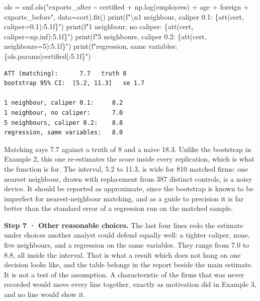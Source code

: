 \documentclass[
  letterpaper,
  10pt,
  twoside,
  openright,
  numbers=noenddot,
  chapterprefix=true]{scrbook}
\newenvironment{Shaded}{}{}
\newcommand{\BuiltInTok}[1]{\textcolor[rgb]{0.84,0.23,0.29}{#1}}
\newcommand{\CharTok}[1]{\textcolor[rgb]{0.01,0.18,0.38}{#1}}
\newcommand{\DecValTok}[1]{\textcolor[rgb]{0.00,0.36,0.77}{#1}}
\newcommand{\FloatTok}[1]{\textcolor[rgb]{0.00,0.36,0.77}{#1}}
\newcommand{\NormalTok}[1]{\textcolor[rgb]{0.14,0.16,0.18}{#1}}
\newcommand{\OperatorTok}[1]{\textcolor[rgb]{0.14,0.16,0.18}{#1}}
\newcommand{\SpecialCharTok}[1]{\textcolor[rgb]{0.00,0.36,0.77}{#1}}
\newcommand{\SpecialStringTok}[1]{\textcolor[rgb]{0.01,0.18,0.38}{#1}}
\newcommand{\StringTok}[1]{\textcolor[rgb]{0.01,0.18,0.38}{#1}}
\begin{document}
\begin{Shaded}
\begin{Highlighting}[]
\NormalTok{ols }\OperatorTok{=}\NormalTok{ smf.ols(}\StringTok{"exports\_after \textasciitilde{} certified + np.log(employees) + age + foreign + exports\_before"}\NormalTok{,}
\NormalTok{              data}\OperatorTok{=}\NormalTok{cert).fit()}
\BuiltInTok{print}\NormalTok{(}\SpecialStringTok{f"}\CharTok{\textbackslash{}n}\SpecialStringTok{1 neighbour, caliper 0.1:   }\SpecialCharTok{\{}\NormalTok{att(cert, caliper}\OperatorTok{=}\FloatTok{0.1}\NormalTok{)}\SpecialCharTok{:5.1f\}}\SpecialStringTok{"}\NormalTok{)}
\BuiltInTok{print}\NormalTok{(}\SpecialStringTok{f"1 neighbour, no caliper:    }\SpecialCharTok{\{}\NormalTok{att(cert, caliper}\OperatorTok{=}\NormalTok{np.inf)}\SpecialCharTok{:5.1f\}}\SpecialStringTok{"}\NormalTok{)}
\BuiltInTok{print}\NormalTok{(}\SpecialStringTok{f"5 neighbours, caliper 0.2:  }\SpecialCharTok{\{}\NormalTok{att(cert, neighbours}\OperatorTok{=}\DecValTok{5}\NormalTok{)}\SpecialCharTok{:5.1f\}}\SpecialStringTok{"}\NormalTok{)}
\BuiltInTok{print}\NormalTok{(}\SpecialStringTok{f"regression, same variables: }\SpecialCharTok{\{}\NormalTok{ols}\SpecialCharTok{.}\NormalTok{params[}\StringTok{\textquotesingle{}certified\textquotesingle{}}\NormalTok{]}\SpecialCharTok{:5.1f\}}\SpecialStringTok{"}\NormalTok{)}
\end{Highlighting}
\end{Shaded}

\begin{verbatim}
ATT (matching):      7.7   truth 8
bootstrap 95% CI:  [5.2, 11.3]   se 1.7

1 neighbour, caliper 0.1:     8.2
1 neighbour, no caliper:      7.0
5 neighbours, caliper 0.2:    8.8
regression, same variables:   8.0
\end{verbatim}

Matching says 7.7 against a truth of 8 and a naive 18.3. Unlike the
bootstrap in Example 2, this one re-estimates the score inside every
replication, which is what the function is for. The interval, 5.2 to
11.3, is wide for 810 matched firms: one nearest neighbour, drawn with
replacement from 387 distinct controls, is a noisy device. It should be
reported as approximate, since the bootstrap is known to be imperfect
for nearest-neighbour matching, and as a guide to precision it is far
better than the standard error of a regression run on the matched
sample.

\textbf{Step 7 · Other reasonable choices.} The last four lines redo the
estimate under choices another analyst could defend equally well: a
tighter caliper, none, five neighbours, and a regression on the same
variables. They range from 7.0 to 8.8, all inside the interval. That is
what a result which does not hang on one decision looks like, and the
table belongs in the report beside the main estimate. It is not a test
of the assumption. A characteristic of the firms that was never recorded
would move every line together, exactly as motivation did in Example 3,
and no line would show it.
\end{document}
